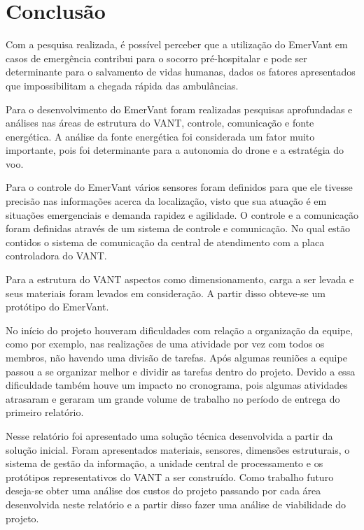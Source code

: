 \chapter{Conclusão}

Com a pesquisa realizada, é possível perceber que a utilização do EmerVant
em casos de emergência contribui para o socorro pré-hospitalar e pode ser determinante para o 
salvamento de vidas humanas, dados os fatores apresentados que impossibilitam a chegada rápida das ambulâncias.

Para o desenvolvimento do EmerVant foram realizadas pesquisas aprofundadas e análises nas áreas 
de estrutura do VANT, controle, comunicação e fonte energética. A análise da fonte energética foi considerada 
um fator muito importante, pois foi determinante para a autonomia do drone e a estratégia do voo. 

Para o controle do EmerVant vários sensores foram definidos para que ele tivesse precisão nas informações acerca da localização,
visto que sua atuação é em situações emergenciais e demanda rapidez e agilidade. O controle e a comunicação foram definidas
através de um sistema de controle e comunicação. No qual estão contidos o sistema de comunicação da central de atendimento
com a placa controladora do VANT.

Para a estrutura do VANT aspectos como dimensionamento, carga a ser levada e seus materiais foram levados em consideração.
A partir disso obteve-se um protótipo do EmerVant.

No início do projeto houveram dificuldades com relação a organização da equipe, como por exemplo, nas realizações
de uma atividade por vez com todos os membros, não havendo uma divisão de tarefas. Após algumas reuniões a equipe 
passou a se organizar melhor e dividir as tarefas dentro do projeto. Devido a essa dificuldade também houve um
impacto no cronograma, pois algumas atividades atrasaram e geraram um grande volume de trabalho no período de entrega do primeiro relatório.

Nesse relatório foi apresentado uma solução técnica desenvolvida a partir da solução inicial. Foram apresentados
materiais, sensores, dimensões estruturais, o sistema de gestão da informação, a unidade central de processamento e
os protótipos representativos do VANT a ser construído.
Como trabalho futuro deseja-se obter uma análise dos custos do projeto passando por cada área desenvolvida neste
relatório e a partir disso fazer uma análise de viabilidade do projeto.